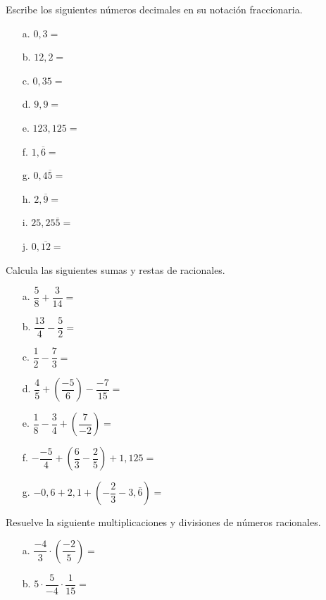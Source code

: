 \documentclass[spanish,letterpaper, 11pt, addpoints, answers]{exam}
\begin{document}
\begin{questions}
\question Escribe los siguientes números decimales en su notación fraccionaria.

\begin{multicols}{2}
\begin{itemize}
  \item[a.] $0,3=$
  \item[b.] $12,2=$
  \item[c.] $0,35=$
  \item[d.] $9,9=$
  \item[e.] $123,125=$
  \item[f.] $1,\overline{6}=$
  \item[g.] $0,4\overline{5}=$
  \item[h.] $2,\overline{9}=$
  \item[i.] $25,25\overline{5}=$
  \item[j.] $0,\overline{12}=$  
\end{itemize}
\end{multicols}

\question Calcula las siguientes sumas y restas de racionales.

\begin{multicols}{2}
  

\begin{itemize}
\item[a.]$\dfrac{5}{8}+\dfrac{3}{14}=$
\item[b.]$\dfrac{13}{4}-\dfrac{5}{2}=$
\item[c.]$\dfrac{1}{2}-\dfrac{7}{3}=$
\item[d.]$\dfrac{4}{5}+\left(\dfrac{-5}{6}\right)-\dfrac{-7}{15}=$
\item[e.]$\dfrac{1}{8}-\dfrac{3}{4}+\left(\dfrac{7}{-2}\right)=$
\item[f.]$-\dfrac{-5}{4}+\left(\dfrac{6}{3}-\dfrac{2}{5}\right)+1{,}125=$
\item[g.]$-0{,}6+2{,}1+(-\dfrac{2}{3}-3{,}\bar{6})=$  
\end{itemize}
\end{multicols}

\question Resuelve la siguiente multiplicaciones y divisiones de números racionales.
\begin{multicols}{2}
  

\begin{itemize}
\item[a.] $\dfrac{-4}{3}\cdot \left(\dfrac{-2}{5}\right)=$

\item[b.] $5\cdot \dfrac{5}{-4}\cdot \dfrac{1}{15}=$


\end{itemize}
\end{multicols}
\end{questions}
\end{document}
